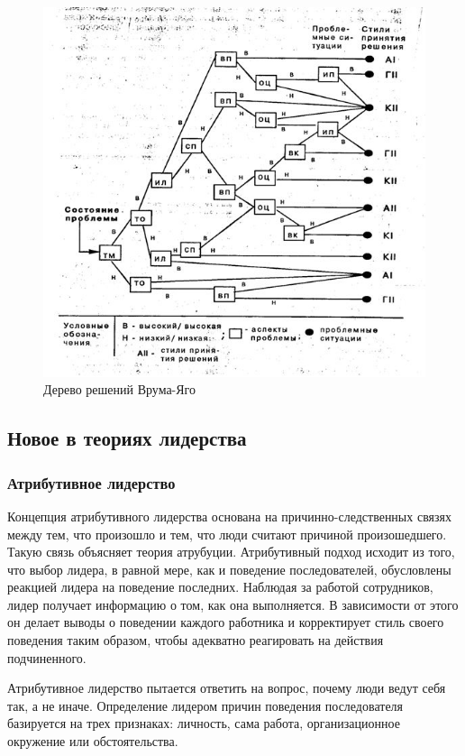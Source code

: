\documentclass[a4paper,12pt,oneside,final]{extarticle}
\makeatletter
\numberwithin{equation}{section}
\def\maxwidth#1{\ifdim\Gin@nat@width>#1 #1\else\Gin@nat@width\fi}
\makeatother
\begin{document}
\begin{figure}[h]
	\centering
	\includegraphics[width=\maxwidth{\textwidth}]{management-figures/leadership_vyy_2}
	\caption{Дерево решений Врума-Яго}
	\label{leadership_vyy_2}
\end{figure}

\subsection{Новое в теориях лидерства}
\subsubsection{Атрибутивное лидерство}
Концепция атрибутивного лидерства основана на причинно-следственных связях между тем, что произошло и тем, что люди считают причиной произошедшего. 
Такую связь объясняет теория атрубуции. 
Атрибутивный подход исходит из того, что выбор лидера, в равной мере, как и поведение последователей, обусловлены реакцией лидера на поведение последних.
Наблюдая за работой сотрудников, лидер получает информацию о том, как она выполняется. 
В зависимости от этого он делает выводы о поведении каждого работника и корректирует стиль своего поведения таким образом, чтобы адекватно реагировать на действия подчиненного. 

Атрибутивное лидерство пытается ответить на вопрос, почему люди ведут себя так, а не иначе. 
Определение лидером причин поведения последователя базируется на трех признаках: личность, сама работа, организационное окружение или обстоятельства.
\end{document}
